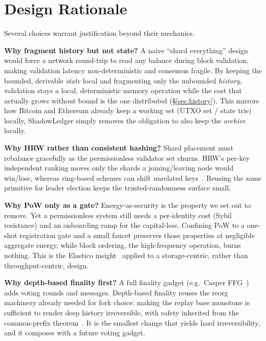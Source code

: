 \section{Design Rationale}
\label{sec:rationale}
Several choices warrant justification beyond their mechanics.

\textbf{Why fragment history but not state?} A naive ``shard everything'' design would force a
network round-trip to read any balance during block validation, making validation latency
non-deterministic and consensus fragile. By keeping the bounded, derivable \emph{state} local and
fragmenting only the unbounded \emph{history}, validation stays a local, deterministic memory
operation while the cost that actually grows without bound is the one distributed
(\S\ref{sec:history}). This mirrors how Bitcoin and Ethereum already keep a working set (UTXO
set / state trie) locally, ShadowLedger simply removes the obligation to also keep the
\emph{archive} locally.

\textbf{Why HRW rather than consistent hashing?} Shard placement must rebalance gracefully as the
permissionless validator set churns. HRW's per-key independent ranking moves only the shards a
joining/leaving node would win/lose, whereas ring-based schemes can shift unrelated
keys~\cite{thaler1998rendezvous,karger1997consistent}. Reusing the same primitive for leader
election keeps the trusted-randomness surface small.

\textbf{Why PoW only as a gate?} Energy-as-security is the property we set out to remove. Yet a
permissionless system still needs a per-identity cost (Sybil resistance) and an onboarding ramp
for the capital-less. Confining PoW to a one-shot registration gate and a small faucet preserves
those properties at negligible aggregate energy, while block ordering, the high-frequency
operation, burns nothing. This is the Elastico insight~\cite{luu2016elastico} applied to a
storage-centric, rather than throughput-centric, design.

\textbf{Why depth-based finality first?} A full finality gadget (e.g.\ Casper
FFG~\cite{buterin2017casper}) adds voting rounds and messages. Depth-based finality reuses the
reorg machinery already needed for fork choice: making the replay base monotone is sufficient to
render deep history irreversible, with safety inherited from the common-prefix
theorem~\cite{garay2015backbone}. It is the smallest change that yields hard irreversibility, and
it composes with a future voting gadget.
